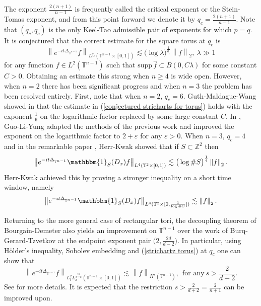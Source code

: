 \documentclass[11pt]{amsart}
\numberwithin{equation}{section}
\newcommand{\Tn}{\mathbb{T}^{n-1}}
\newcommand{\la}{\lambda}
\newcommand\norm[1]{\left\lVert#1\right\rVert}
\newcommand{\lpnorm}[3]{\norm{#1}_{L^{#2}(#3)}}
\newcommand{\altlpnorm}[2]{\norm{#1}_{#2}}
\newcommand{\mixlpnorm}[4]{\norm{#1}_{L^{#2}_{t} L^{#3}_{x}(#4)}}
\newcommand{\supp}[1]{\text{supp}\, #1}
\newcommand{\Z}[1][]{\mathbb{Z}^#1}
\newcommand{\T}[1][]{\mathbb{T}^#1}
\newcommand{\laplac}[1]{\Delta_{#1}}
\begin{document}
The exponent $\frac{2(n+1)}{n-1}$ is frequently called the critical exponent or the Stein-Tomas exponent, and from this point forward we denote it by $q_c = \frac{2(n+1)}{n-1}$. Note that $(q_c,q_c)$ is the only Keel-Tao admissible pair of exponents for which $p = q$. It is conjectured that the correct estimate for the square torus at $q_c$ is 
\begin{equation} \label{conjectured stricharts for torus}
    \lpnorm{e^{-it\laplac{\Tn}} f}{q_c}{\Tn \times [0, 1]} \lesssim \big( \log \la \big)^{\frac{1}{q_c}} \altlpnorm{f}{2}, \ \la \gg 1
\end{equation}
for any function $f \in L^2(\Tn)$ such that $\supp\widehat{f} \subset B(0,C\la)$ for some constant $C > 0$. Obtaining an estimate this strong when $n \geq 4$ is wide open. However, when $n = 2$ there has been significant progress and when $n = 3$ the problem has been resolved entirely. First, note that when $n = 2$, $q_c = 6$. Guth-Maldague-Wang showed in \cite{GuthMaldagueWangImprovedDecoupling} that the estimate in (\ref{conjectured stricharts for torus}) holds with the exponent $\frac{1}{6}$ on the logarithmic factor replaced by some large constant $C$. In \cite{GuoLiYungImprovedStrichartz}, Guo-Li-Yung adapted the methods of the previous work and improved the exponent on the logarithmic factor to $2 + \varepsilon$ for any $\varepsilon > 0$. When $n = 3$, $q_c = 4$ and in the remarkable paper \cite{HerrKwak2024}, Herr-Kwak showed that if $S \subset \Z{2}$ then
\begin{equation} \label{Herr-Kwak Strichartz}
    \lpnorm{e^{-it\laplac{\Tn}}\mathbbm{1}_S(D_x)f}{4}{\T{2} \times [0,1]} \lesssim \big(\log \#S\big)^{\frac{1}{4}}\altlpnorm{f}{2}.
\end{equation} 
Herr-Kwak achieved this by proving a stronger inequality on a short time window, namely
\begin{equation} \label{Herr-Kwak short time Strichartz}
    \lpnorm{e^{-it\laplac{\Tn}}\mathbbm{1}_S(D_x)f}{4}{\T{2} \times [0,\frac{1}{\log \#S}]} \lesssim \altlpnorm{f}{2}.
\end{equation}

Returning to the more general case of rectangular tori, the decoupling theorem of Bourgain-Demeter also yields an improvement on $\Tn$ over the work of Burq-Gerard-Tzvetkov at the endpoint exponent pair $\big(2, \frac{2d}{d-2}\big)$. In particular, using H\"{o}lder's inequality, Sobolev embedding and (\ref{strichartz torus}) at $q_c$ one can show that 
\begin{equation} \label{endpoint strichartz tori}
    \mixlpnorm{e^{-it\laplac{\Tn}}f}{2}{\frac{2d}{d-2}}{\Tn \times [0,1]} \lesssim \norm{f}_{H^s(\Tn)}, \ \ \text{for any} \ s > \frac{2}{d+2}.
\end{equation}
See \cite{BlairHuangSoggeStrichartz} for more details. It is expected that the restriction $s > \frac{2}{d+2} = \frac{2}{n+1}$ can be improved upon.
\end{document}
